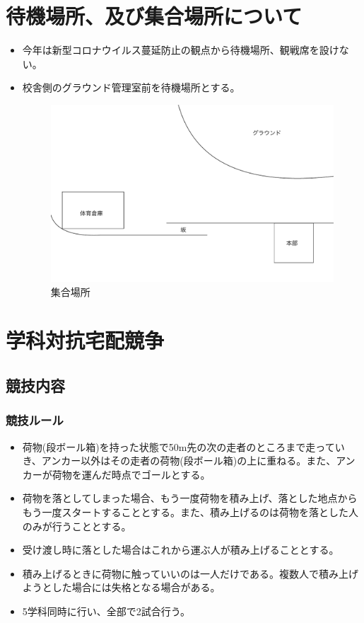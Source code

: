 \documentclass[titlepage]{jarticle}
\begin{document}
 \section{待機場所、及び集合場所について}
  \begin{itemize}
   \item 今年は新型コロナウイルス蔓延防止の観点から待機場所、観戦席を設けない。
   \item 校舎側のグラウンド管理室前を待機場所とする。
   \begin{figure}[H]
    \centering
    \includegraphics[width=12cm]{syugo.pdf}
    \caption{集合場所}
   \end{figure}
%
  \end{itemize}
\clearpage
 \setcounter{section}{0}
 \section{学科対抗宅配競争}
  \subsection{競技内容}
   \subsubsection{競技ルール}
    \begin{itemize}
     \item 荷物(段ボール箱)を持った状態で50m先の次の走者のところまで走っていき、アンカー以外はその走者の荷物(段ボール箱)の上に重ねる。また、アンカーが荷物を運んだ時点でゴールとする。
     \item 荷物を落としてしまった場合、もう一度荷物を積み上げ、落とした地点からもう一度スタートすることとする。また、積み上げるのは荷物を落とした人のみが行うこととする。
     \item 受け渡し時に落とした場合はこれから運ぶ人が積み上げることとする。
     \item 積み上げるときに荷物に触っていいのは一人だけである。複数人で積み上げようとした場合には失格となる場合がある。
     \item 5学科同時に行い、全部で2試合行う。
    \end{itemize}
\end{document}
